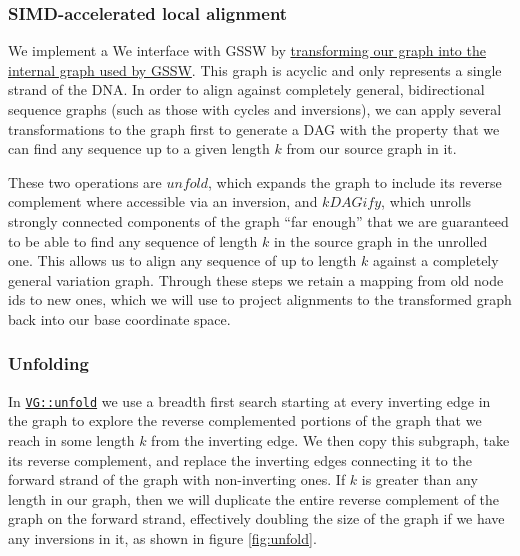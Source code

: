 \documentclass[12pt]{article}
\begin{document}
\subsubsection{SIMD-accelerated local alignment}

We implement a 
We interface with GSSW by \href{https://github.com/vgteam/vg/blob/fbcb6e62/src/vg.cpp#L6461-L6532}{transforming our graph into the internal graph used by GSSW}.
This graph is acyclic and only represents a single strand of the DNA.
In order to align against completely general, bidirectional sequence graphs (such as those with cycles and inversions), we can apply several transformations to the graph first to generate a DAG with the property that we can find any sequence up to a given length $k$ from our source graph in it.

These two operations are $unfold$, which expands the graph to include its reverse complement where accessible via an inversion, and $kDAGify$, which unrolls strongly connected components of the graph ``far enough'' that we are guaranteed to be able to find any sequence of length $k$ in the source graph in the unrolled one.
This allows us to align any sequence of up to length $k$ against a completely general variation graph.
Through these steps we retain a mapping from old node ids to new ones, which we will use to project alignments to the transformed graph back into our base coordinate space.

\subsubsection{Unfolding}

In \href{https://github.com/vgteam/vg/blob/fbcb6e62/src/vg.cpp#L8289-L8400}{{\tt VG::unfold}} we use a breadth first search starting at every inverting edge in the graph to explore the reverse complemented portions of the graph that we reach in some length $k$ from the inverting edge.
We then copy this subgraph, take its reverse complement, and replace the inverting edges connecting it to the forward strand of the graph with non-inverting ones.
If $k$ is greater than any length in our graph, then we will duplicate the entire reverse complement of the graph on the forward strand, effectively doubling the size of the graph if we have any inversions in it, as shown in figure \ref{fig:unfold}.
\end{document}
